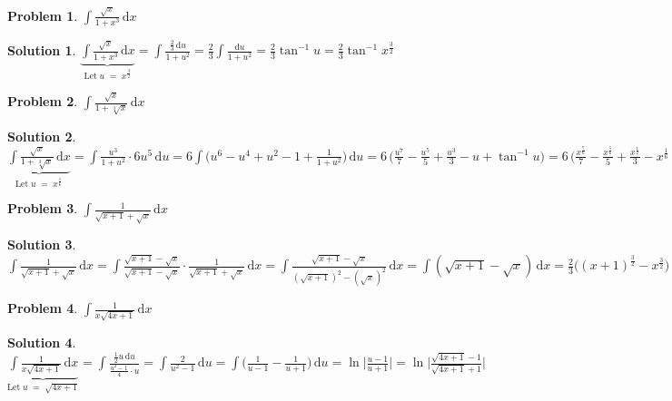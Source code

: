 \documentclass[11pt,a4paper]{article}
\newcommand{\ds}{\displaystyle}
\theoremstyle{definition}
\newtheorem*{problem}{Problem}
\newtheorem*{solution}{Solution}
\begin{document}
\begin{problem}
  $\ds\int\!\frac{\sqrt{x}}{1+x^3}\,\text{d}x$
\end{problem}

\begin{solution}
  $\ds\underbrace{\int\!\frac{\sqrt{x}}{1+x^3}\,\text{d}x}_{\text{Let}\; u\;=\;x^{\frac{3}{2}}} = \int\!\frac{\frac{2}{3}\,\text{d}u}{1 + u^2} = \frac{2}{3}\int\!\frac{\text{d}u}{1 + u^2} = \frac{2}{3}\tan^{-1}u = \frac{2}{3}\tan^{-1}\!x^{\frac{3}{2}}$
\end{solution}

\begin{problem}
  $\ds\int\!\frac{\sqrt{x}}{1+\sqrt[3]{x}}\,\text{d}x$
\end{problem}

\begin{solution}
  $\ds\underbrace{\int\!\frac{\sqrt{x}}{1+\sqrt[3]{x}}\,\text{d}x}_{\text{Let}\; u\;=\;x^{\frac{1}{6}}} = \int\!\frac{u^3}{1 + u^2}\cdot 6u^5\,\text{d}u = 6\int\!\Big(u^6 - u^4 + u^2 - 1 + \frac{1}{1 + u^2}\Big)\,\text{d}u = 6\,\Big(\frac{u^7}{7} - \frac{u^5}{5} + \frac{u^3}{3} - u + \tan^{-1}u\Big) = 6\,\Big(\frac{x^{\frac{7}{6}}}{7} - \frac{x^{\frac{5}{6}}}{5} + \frac{x^{\frac{1}{2}}}{3} - x^{\frac{1}{6}} + \tan^{-1}\!x^{\frac{1}{6}}\Big) $
\end{solution}

\begin{problem}
  $\ds\int\!\frac{1}{\sqrt{x+1}+\sqrt{x}}\,\text{d}x$
\end{problem}

\begin{solution}
  $\ds\int\!\frac{1}{\sqrt{x+1}+\sqrt{x}}\,\text{d}x = \int\!\frac{\sqrt{x+1} - \sqrt{x}}{\sqrt{x+1} - \sqrt{x}}\cdot\frac{1}{\sqrt{x + 1} + \sqrt{x}}\,\text{d}x = \int\!\frac{\sqrt{x+1} - \sqrt{x}}{(\sqrt{x+1})^2 - (\sqrt{x})^2}\,\text{d}x = \int\!(\sqrt{x + 1} - \sqrt{x})\,\text{d}x = \frac{2}{3}\big((x + 1)^{\frac{3}{2}} - x^{\frac{3}{2}}\big)$
\end{solution}

\begin{problem}
  $\ds\int\!\frac{1}{x\sqrt{4x+1}}\,\text{d}x$
\end{problem}

\begin{solution}
  $\ds\underbrace{\int\!\frac{1}{x\sqrt{4x+1}}\,\text{d}x}_{\text{Let}\; u\;=\;\sqrt{4 x + 1}} = \int\!\frac{\frac{1}{2}u\,\text{d}u}{\frac{u^2 - 1}{4}\cdot u} = \int\!\frac{2}{u^2 - 1}\,\text{d}u = \int\!\Big(\frac{1}{u - 1} - \frac{1}{u + 1}\Big)\,\text{d}u = \ln\Big|\frac{u - 1}{u + 1}\Big| = \ln\Big|\frac{\sqrt{4 x + 1} - 1}{\sqrt{4x + 1} + 1}\Big|$
\end{solution}
\end{document}

